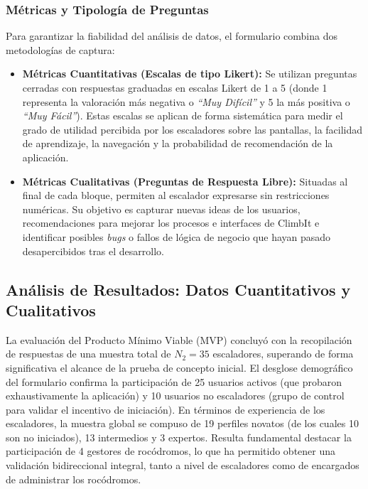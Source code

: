\subsubsection{Métricas y Tipología de Preguntas}

Para garantizar la fiabilidad del análisis de datos, el formulario combina dos metodologías de captura:

\begin{itemize}
    \item \textbf{Métricas Cuantitativas (Escalas de tipo Likert):} Se utilizan preguntas cerradas con respuestas graduadas en escalas Likert de 1 a 5 (donde 1 representa la valoración más negativa o \textit{``Muy Difícil''} y 5 la más positiva o \textit{``Muy Fácil''}). Estas escalas se aplican de forma sistemática para medir el grado de utilidad percibida por los escaladores sobre las pantallas, la facilidad de aprendizaje, la navegación y la probabilidad de recomendación de la aplicación.
    \item \textbf{Métricas Cualitativas (Preguntas de Respuesta Libre):} Situadas al final de cada bloque, permiten al escalador expresarse sin restricciones numéricas. Su objetivo es capturar nuevas ideas de los usuarios, recomendaciones para mejorar los procesos e interfaces de ClimbIt e identificar posibles \textit{bugs} o fallos de lógica de negocio que hayan pasado desapercibidos tras el desarrollo.
\end{itemize}

\subsection{Análisis de Resultados: Datos Cuantitativos y Cualitativos}
\label{subsec:analisisDatosMVP}

La evaluación del Producto Mínimo Viable (MVP) concluyó con la recopilación de respuestas de una muestra total de $N_2 = 35$ escaladores, superando de forma significativa el alcance de la prueba de concepto inicial. El desglose demográfico del formulario confirma la participación de 25 usuarios activos (que probaron exhaustivamente la aplicación) y 10 usuarios no escaladores (grupo de control para validar el incentivo de iniciación). En términos de experiencia de los escaladores, la muestra global se compuso de 19 perfiles novatos (de los cuales 10 son no iniciados), 13 intermedios y 3 expertos. Resulta fundamental destacar la participación de 4 gestores de rocódromos, lo que ha permitido obtener una validación bidireccional integral, tanto a nivel de escaladores como de encargados de administrar los rocódromos.

